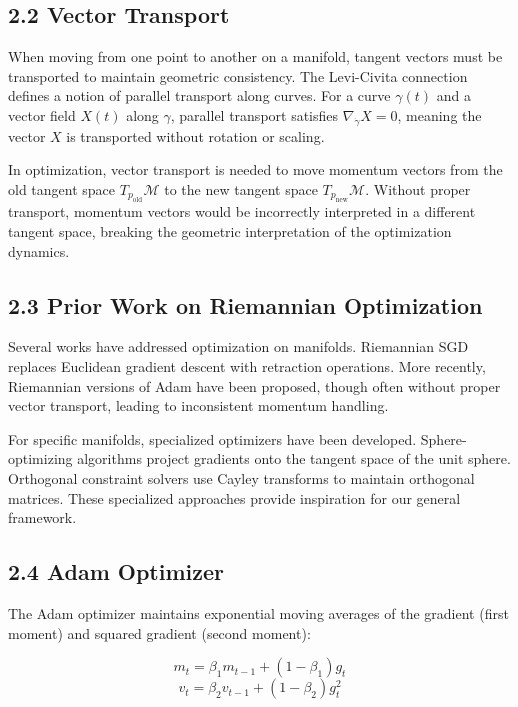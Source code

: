 \documentclass[12pt]{article}
\begin{document}
\subsection{2.2 Vector Transport}

When moving from one point to another on a manifold, tangent vectors must be transported to maintain geometric consistency. The Levi-Civita connection defines a notion of parallel transport along curves. For a curve $\gamma(t)$ and a vector field $X(t)$ along $\gamma$, parallel transport satisfies $\nabla_{\dot{\gamma}}X = 0$, meaning the vector $X$ is transported without rotation or scaling.

In optimization, vector transport is needed to move momentum vectors from the old tangent space $T_{p_{\text{old}}}\mathcal{M}$ to the new tangent space $T_{p_{\text{new}}}\mathcal{M}$. Without proper transport, momentum vectors would be incorrectly interpreted in a different tangent space, breaking the geometric interpretation of the optimization dynamics.

\subsection{2.3 Prior Work on Riemannian Optimization}

Several works have addressed optimization on manifolds. Riemannian SGD replaces Euclidean gradient descent with retraction operations. More recently, Riemannian versions of Adam have been proposed, though often without proper vector transport, leading to inconsistent momentum handling.

For specific manifolds, specialized optimizers have been developed. Sphere-optimizing algorithms project gradients onto the tangent space of the unit sphere. Orthogonal constraint solvers use Cayley transforms to maintain orthogonal matrices. These specialized approaches provide inspiration for our general framework.

\subsection{2.4 Adam Optimizer}

The Adam optimizer maintains exponential moving averages of the gradient (first moment) and squared gradient (second moment):

\begin{equation}
m_t = \beta_1 m_{t-1} + (1 - \beta_1) g_t
\end{equation}
\begin{equation}
v_t = \beta_2 v_{t-1} + (1 - \beta_2) g_t^2
\end{equation}
\end{document}
